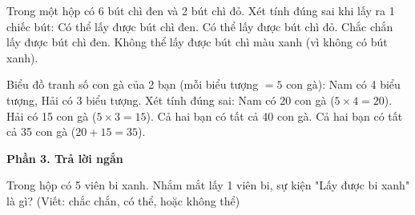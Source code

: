 \begin{ex} %
Trong một hộp có 6 bút chì đen và 2 bút chì đỏ. Xét tính đúng sai khi lấy ra 1 chiếc bút:
\choiceTF
{\True Có thể lấy được bút chì đen.}
{\True Có thể lấy được bút chì đỏ.}
{Chắc chắn lấy được bút chì đen.}
{\True Không thể lấy được bút chì màu xanh (vì không có bút xanh).}
\end{ex}

\begin{ex} %
Biểu đồ tranh số con gà của 2 bạn (mỗi biểu tượng $= 5$ con gà): Nam có 4 biểu tượng, Hải có 3 biểu tượng. Xét tính đúng sai:
\choiceTF
{\True Nam có 20 con gà ($5 \times 4 = 20$).}
{\True Hải có 15 con gà ($5 \times 3 = 15$).}
{Cả hai bạn có tất cả 40 con gà.}
{\True Cả hai bạn có tất cả 35 con gà ($20 + 15 = 35$).}
\end{ex}

\textbf{Phần 3. Trả lời ngắn}

\begin{ex} %
Trong hộp có 5 viên bi xanh. Nhắm mắt lấy 1 viên bi, sự kiện "Lấy được bi xanh" là gì? (Viết: chắc chắn, có thể, hoặc không thể)
\end{ex}

